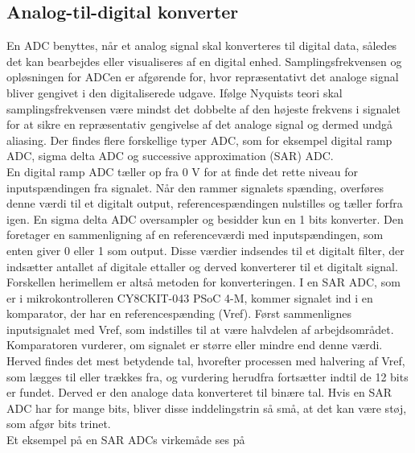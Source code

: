 \subsection{Analog-til-digital konverter}
En ADC benyttes, når et analog signal skal konverteres til digital data, således det kan bearbejdes eller visualiseres af en digital enhed. Samplingsfrekvensen og opløsningen for ADCen er afgørende for, hvor repræsentativt det analoge signal bliver gengivet i den digitaliserede udgave. Ifølge Nyquists teori skal samplingsfrekvensen være mindst det dobbelte af den højeste frekvens i signalet for at sikre en repræsentativ gengivelse af det analoge signal og dermed undgå aliasing. Der findes flere forskellige typer ADC, som for eksempel digital ramp ADC, sigma delta ADC og successive approximation (SAR) ADC.\\ 
En digital ramp ADC tæller op fra 0 V for at finde det rette niveau for inputspændingen fra signalet. Når den rammer signalets spænding, overføres denne værdi til et digitalt output, referencespændingen nulstilles og tæller forfra igen. En sigma delta ADC oversampler og besidder kun en 1 bits konverter. Den foretager en sammenligning af en referenceværdi med inputspændingen, som enten giver 0 eller 1 som output. Disse værdier indsendes til et digitalt filter, der indsætter antallet af digitale ettaller og derved konverterer til et digitalt signal. Forskellen herimellem er altså metoden for konverteringen. I en SAR ADC, som er i mikrokontrolleren CY8CKIT-043 PSoC 4-M, kommer signalet ind i en komparator, der har en referencespænding (Vref). Først sammenlignes inputsignalet med Vref, som indstilles til at være halvdelen af arbejdsområdet. Komparatoren vurderer, om signalet er større eller mindre end denne værdi. Herved findes det mest betydende tal, hvorefter processen med halvering af Vref, som lægges til eller trækkes fra, og vurdering herudfra fortsætter indtil de 12 bits er fundet. Derved er den analoge data konverteret til binære tal. Hvis en SAR ADC har for mange bits, bliver disse inddelingstrin så små, at det kan være støj, som afgør bits trinet. \citep{Moore2004,Sheingold2014} \\
Et eksempel på en SAR ADCs virkemåde ses på 
